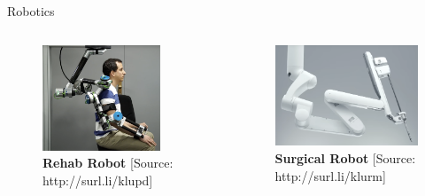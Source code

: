 \documentclass[aspectratio=169]{beamer}
\begin{document}
\begin{frame}{Robotics}
  \begin{columns}
    \begin{column}{0.475\textwidth}
      \begin{figure}
        \centering
        \includegraphics[width=0.825\textwidth]{rehabrobots.png}
        \caption{\scriptsize \textbf{Rehab Robot} [Source: http://surl.li/klupd]}
      \end{figure}
    \end{column}
    \begin{column}{0.5\textwidth}
      \begin{figure}
        \centering
        \includegraphics[width=1\textwidth]{surgicalrobot.png}
        \caption{\scriptsize \textbf{Surgical Robot} [Source: http://surl.li/klurm]}
      \end{figure}
    \end{column}    
  \end{columns}
\end{frame}
\end{document}
